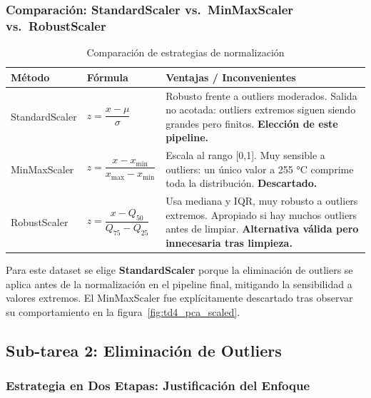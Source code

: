 \documentclass[12pt,a4paper]{article}
\begin{document}
\subsubsection{Comparación: StandardScaler vs.\ MinMaxScaler vs.\ RobustScaler}

\begin{table}[H]
\centering
\caption{Comparación de estrategias de normalización}
\begin{tabular}{@{}lp{4.8cm}p{5.5cm}@{}}
\toprule
\textbf{Método} & \textbf{Fórmula} & \textbf{Ventajas / Inconvenientes}\\
\midrule
StandardScaler
  & $z = \dfrac{x - \mu}{\sigma}$
  & Robusto frente a outliers moderados. Salida no acotada:
    outliers extremos siguen siendo grandes pero finitos.
    \textbf{Elección de este pipeline.}\\[0.6em]
MinMaxScaler
  & $z = \dfrac{x - x_{\min}}{x_{\max} - x_{\min}}$
  & Escala al rango [0,1]. Muy sensible a outliers: un único valor a
    255 °C comprime toda la distribución. \textbf{Descartado.}\\[0.6em]
RobustScaler
  & $z = \dfrac{x - Q_{50}}{Q_{75} - Q_{25}}$
  & Usa mediana y IQR, muy robusto a outliers extremos.
    Apropiado si hay muchos outliers antes de limpiar.
    \textbf{Alternativa válida pero innecesaria tras limpieza.}\\
\bottomrule
\end{tabular}
\end{table}

Para este dataset se elige \textbf{StandardScaler} porque la eliminación de outliers
se aplica antes de la normalización en el pipeline final, mitigando la sensibilidad
a valores extremos. El MinMaxScaler fue explícitamente descartado tras observar
su comportamiento en la figura~\ref{fig:td4_pca_scaled}.

\subsection{Sub-tarea 2: Eliminación de Outliers}

\subsubsection{Estrategia en Dos Etapas: Justificación del Enfoque}
\end{document}

